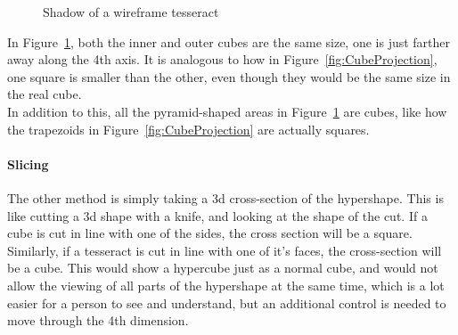 \documentclass[12pt]{article}
\begin{document}
\begin{figure}
    \centering
    \caption{Shadow of a wireframe tesseract}\label{fig:TesseractProjection}
\end{figure}

In Figure~\ref{fig:TesseractProjection}, both the inner and outer cubes are the same size, one is just farther away along the 4th axis.
It is analogous to how in Figure~\ref{fig:CubeProjection}, one square is smaller than the other, even though they would be the same size in the real cube.\\
In addition to this, all the pyramid-shaped areas in Figure~\ref{fig:TesseractProjection} are cubes, like how the trapezoids in Figure~\ref{fig:CubeProjection} are actually squares.


\paragraph{Slicing}
The other method is simply taking a 3d cross-section of the hypershape. This is like cutting a 3d shape with a knife, and looking at the shape of the cut.
If a cube is cut in line with one of the sides, the cross section will be a square.
Similarly, if a tesseract is cut in line with one of it's faces, the cross-section will be a cube.
This would show a hypercube just as a normal cube, and would not allow the viewing of all parts of the hypershape at the same time, which is a lot easier for a person to see and understand, but an additional control is needed to move through the 4th dimension.
\end{document}
